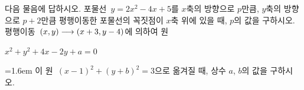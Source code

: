 다음 물음에 답하시오.
 포물선~$y=2x^2-4x+5$를 $x$축의 방향으로 $p$만큼, $y$축의 방향으로 $p+2$만큼 평행이동한 포물선의 꼭짓점이 $x$축 위에 있을 때, $p$의 값을 구하시오.
 평행이동~$(x{,}\mkern3mu\mathopen{}y)\longrightarrow(x+3{,}\mkern3mu\mathopen{}y-4)$에 의하여 원\par\smallskip\centerline{$x^2+y^2+4x-2y+a=0$}\par\smallskip\noindent\hangindent=1.6em 이 원~$(x-1)^2+(y+b)^2=3$으로 옮겨질 때, 상수 $a$, $b$의 값을 구하시오.
